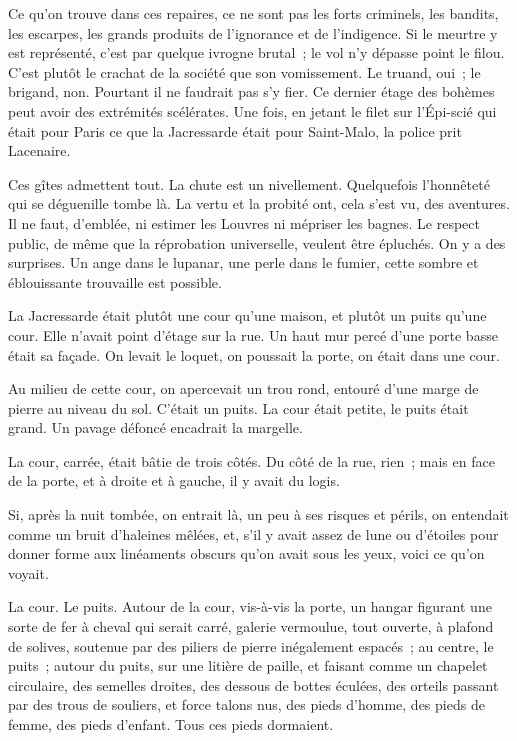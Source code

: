 \documentclass[french,twoside]{book} %
\begin{document}
Ce qu’on trouve dans ces repaires, ce ne sont pas les forts criminels, les bandits, les escarpes, les grands produits de l’ignorance et de l’indigence. Si le meurtre  y est représenté, c’est par quelque ivrogne brutal ; le vol n’y dépasse point le filou. C’est plutôt le crachat de la société que son vomissement. Le truand, oui ; le brigand, non. Pourtant il ne faudrait pas s’y fier. Ce dernier étage des bohèmes peut avoir des extrémités scélérates. Une fois, en jetant le filet sur l’Épi-scié qui était pour Paris ce que la Jacressarde était pour Saint-Malo, la police prit Lacenaire.\par
Ces gîtes admettent tout. La chute est un nivellement. Quelquefois l’honnêteté qui se déguenille tombe là. La vertu et la probité ont, cela s’est vu, des aventures. Il ne faut, d’emblée, ni estimer les Louvres ni mépriser les bagnes. Le respect public, de même que la réprobation universelle, veulent être épluchés. On y a des surprises. Un ange dans le lupanar, une perle dans le fumier, cette sombre et éblouissante trouvaille est possible.\par
La Jacressarde était plutôt une cour qu’une maison, et plutôt un puits qu’une cour. Elle n’avait point d’étage sur la rue. Un haut mur percé d’une porte basse était sa façade. On levait le loquet, on poussait la porte, on était dans une cour.\par
Au milieu de cette cour, on apercevait un trou rond, entouré d’une marge de pierre au niveau du sol. C’était un puits. La cour était petite, le puits était grand. Un pavage défoncé encadrait la margelle.\par
La cour, carrée, était bâtie de trois côtés. Du côté de la rue, rien ; mais en face de la porte, et à droite et à gauche, il y avait du logis.\par
Si, après la nuit tombée, on entrait là, un peu à ses  risques et périls, on entendait comme un bruit d’haleines mêlées, et, s’il y avait assez de lune ou d’étoiles pour donner forme aux linéaments obscurs qu’on avait sous les yeux, voici ce qu’on voyait.\par
La cour. Le puits. Autour de la cour, vis-à-vis la porte, un hangar figurant une sorte de fer à cheval qui serait carré, galerie vermoulue, tout ouverte, à plafond de solives, soutenue par des piliers de pierre inégalement espacés ; au centre, le puits ; autour du puits, sur une litière de paille, et faisant comme un chapelet circulaire, des semelles droites, des dessous de bottes éculées, des orteils passant par des trous de souliers, et force talons nus, des pieds d’homme, des pieds de femme, des pieds d’enfant. Tous ces pieds dormaient.\par
\end{document}
